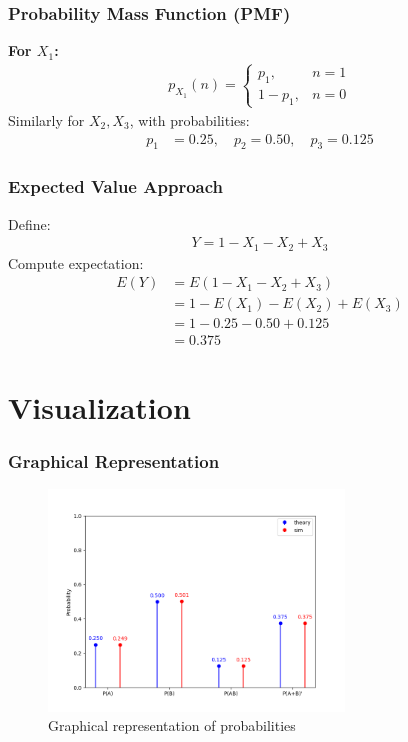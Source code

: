 \documentclass{beamer}
\begin{document}
\begin{frame}
    \frametitle{Probability Mass Function (PMF)}
    \textbf{For \(X_1\):}
    \begin{align}
        p_{X_1}(n) =
        \begin{cases}
            p_1 ,& n = 1\\
            1 - p_1 ,& n = 0
        \end{cases}
    \end{align}
    Similarly for \(X_2, X_3\), with probabilities:
    \begin{align}
        p_1 &= 0.25, \quad p_2 = 0.50, \quad p_3 = 0.125
    \end{align}
\end{frame}

\begin{frame}
    \frametitle{Expected Value Approach}
    Define:
    \begin{align}
        Y = 1 - X_1 - X_2 + X_3
    \end{align}
    Compute expectation:
    \begin{align}
        E(Y) &= E(1 - X_1 - X_2 + X_3)\\
        &= 1 - E(X_1) - E(X_2) + E(X_3)\\
        &= 1 - 0.25 - 0.50 + 0.125\\
        &= 0.375
    \end{align}
\end{frame}

\section{Visualization}
\begin{frame}
    \frametitle{Graphical Representation}
    \begin{figure}[ht]
        \centering
        \includegraphics[width=0.7\textwidth]{figs/plot.png}
        \caption{Graphical representation of probabilities}
    \end{figure}
\end{frame}
\end{document}
